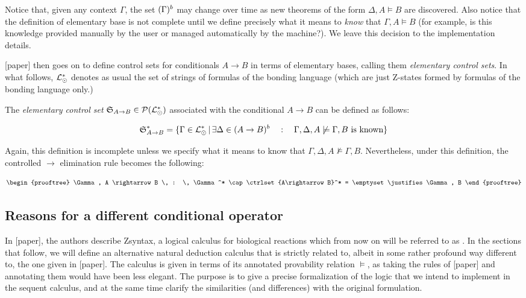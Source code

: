 Notice that, given any context $\Gamma$, the set $(\Gamma)^{b}$ may change
over time as new theorems of the form $\Delta, A \models B$ are discovered.
Also notice that the definition of elementary base is not complete until we
define precisely what it means to \emph{know} that $\Gamma, A \models B$ (for
example, is this knowledge provided manually by the user or managed
automatically by the machine?). We leave this decision to the implementation
details.

[paper] then goes on to define control sets for conditionals $A \rightarrow B$
in terms of elementary bases, calling them \emph{elementary control sets}.  In
what follows, $\mathcal{L}_{\odot}^*$ denotes as usual the set of strings of formulas
of the bonding language (which are just Z-states formed by formulas of the
bonding language only.)

\begin{definition}
  The \emph{elementary control set}
  $\mathfrak{S}_{A \rightarrow B} \in \mathcal{P}(\mathcal{L}_{\odot}^*)$ associated with
  the conditional $A \rightarrow B$ can be defined as follows:

  \[
    \mathfrak{S}_{A \rightarrow B}^* = \{
    \Gamma \in \mathcal{L}_{\odot}^* \, | \, \exists \Delta \in (A \rightarrow
    B)^{b}
    \quad : \quad \Gamma, \Delta, A \not \models \Gamma, B \text{ is known}
    \}
  \]
\end{definition}

Again, this definition is incomplete unless we specify what it means to know
that $\Gamma, \Delta, A \not \models \Gamma, B$. Nevertheless, under this
definition, the controlled $\rightarrow$ elimination rule becomes the following:

\[
  \begin{prooftree}
    \Gamma, A \rightarrow B \, : \, \Gamma^* \cap \ctrlset{A\rightarrow B}^* =
    \emptyset
    \justifies
    \Gamma, B
  \end{prooftree}
\]

\subsection{Reasons for a different conditional operator}

In [paper], the authors describe Zsyntax, a logical calculus for biological
reactions which from now on will be referred to as \znd{}. In the sections that
follow, we will define an alternative natural deduction calculus that is
strictly related to, albeit in some rather profound way different to, the one
given in [paper].
The calculus is given in terms of its annotated provability relation $\models$,
as taking the rules of [paper] and annotating them would have been less elegant.
The purpose is to give a precise formalization of the logic that we intend to
implement in the sequent calculus, and at the same time clarify the similarities
(and differences) with the original formulation.

